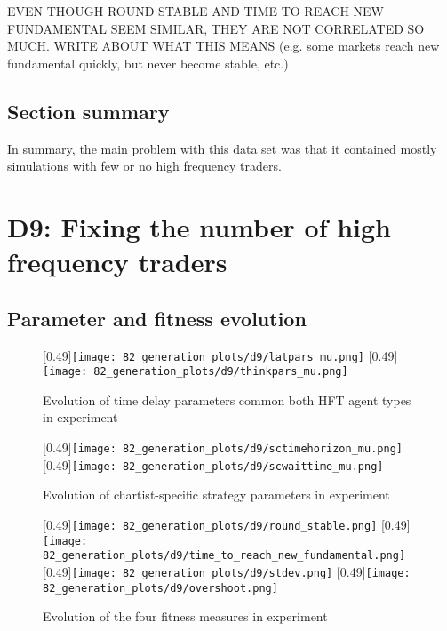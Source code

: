 EVEN THOUGH ROUND STABLE AND TIME TO REACH NEW FUNDAMENTAL SEEM SIMILAR, THEY ARE NOT CORRELATED SO MUCH. WRITE ABOUT WHAT THIS MEANS (e.g. some markets reach new fundamental quickly, but never become stable, etc.)

\subsection{Section summary}
In summary, the main problem with this data set was that it contained mostly simulations with few or no high frequency traders. 

\section{D9: Fixing the number of high frequency traders}

\subsection{Parameter and fitness evolution}

\begin{figure}
	\centering
	[0.49\linewidth]{\texttt{[image: 82\_generation\_plots/d9/latpars\_mu.png]}}
	[0.49\linewidth]{\texttt{[image: 82\_generation\_plots/d9/thinkpars\_mu.png]}}
	\caption{Evolution of time delay parameters common both HFT agent types in experiment \dthree}
	\label{fig:d9_evolution_latpars}
\end{figure}


\begin{figure}
	[0.49\linewidth]{\texttt{[image: 82\_generation\_plots/d9/sctimehorizon\_mu.png]}}
	[0.49\linewidth]{\texttt{[image: 82\_generation\_plots/d9/scwaittime\_mu.png]}}
	\caption{Evolution of chartist-specific strategy parameters in experiment \dnine}
	\label{fig:d9_evolution_thinkpars}
\end{figure}



\begin{figure}
	\centering
	[0.49\linewidth]{\texttt{[image: 82\_generation\_plots/d9/round\_stable.png]}}
	[0.49\linewidth]{\texttt{[image: 82\_generation\_plots/d9/time\_to\_reach\_new\_fundamental.png]}}
	[0.49\linewidth]{\texttt{[image: 82\_generation\_plots/d9/stdev.png]}}
	[0.49\linewidth]{\texttt{[image: 82\_generation\_plots/d9/overshoot.png]}}
	\caption{Evolution of the four fitness measures in experiment \dnine}
	\label{fig:d9_evolution_fitness}
\end{figure}

